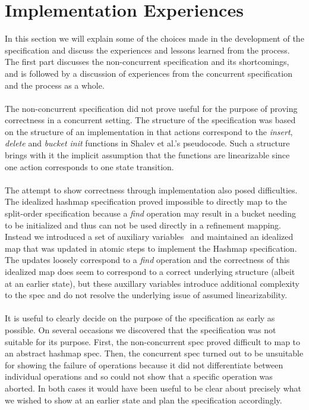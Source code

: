 \documentclass{uit-thesis}
\begin{document}
\section{Implementation Experiences}
In this section we will explain some of the choices made in the development of the specification and discuss the experiences and lessons learned from the process. The first part discusses the non-concurrent specification and its shortcomings, and is followed by a discussion of experiences from the concurrent specification and the process as a whole. 
\\\\
The non-concurrent specification did not prove useful for the purpose of proving correctness in a concurrent setting. The structure of the specification was based on the structure of an implementation in that actions correspond to the \textit{insert}, \textit{delete} and \textit{bucket init} functions in Shalev et al.'s pseudocode. Such a structure brings with it the implicit assumption that the functions are linearizable since one action corresponds to one state transition.
\\\\
The attempt to show correctness through implementation also posed difficulties. The idealized hashmap specification proved impossible to directly map to the split-order specification because a \textit{find} operation may result in a bucket needing to be initialized and thus can not be used directly in a refinement mapping. Instead we introduced a set of auxiliary variables~\cite{Lamport2019a} and maintained an idealized map that was updated in atomic steps to implement the Hashmap specification. The updates loosely correspond to a \textit{find} operation and the correctness of this idealized map does seem to correspond to a correct underlying structure (albeit at an earlier state), but these auxillary variables introduce additional complexity to the spec and do not resolve the underlying issue of assumed linearizability.
\\\\
It is useful to clearly decide on the purpose of the specification as early as possible. On several occasions we discovered that the specification was not suitable for its purpose. First, the non-concurrent spec proved difficult to map to an abstract hashmap spec. Then, the concurrent spec turned out to be unsuitable for showing the failure of operations because it did not differentiate between individual operations and so could not show that a specific operation was aborted. In both cases it would have been useful to be clear about precisely what we wished to show at an earlier state and plan the specification accordingly.
\end{document}
